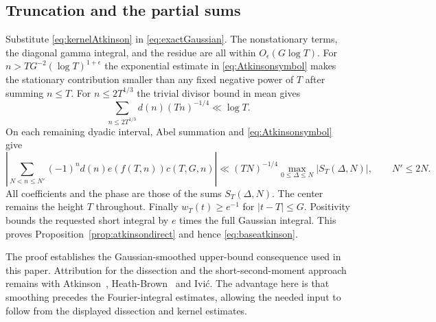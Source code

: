 \subsection{Truncation and the partial sums}
Substitute \eqref{eq:kernelAtkinson} in \eqref{eq:exactGaussian}.
The nonstationary terms, the diagonal gamma integral, and the residue
are all within $O_\epsilon(G\log T)$.
For $n>TG^{-2}(\log T)^{1+\epsilon}$ the exponential estimate in
\eqref{eq:Atkinsonsymbol} makes the stationary contribution smaller
than any fixed negative power of $T$ after summing $n\le T$.
For $n\le2T^{1/3}$ the trivial divisor bound in mean gives
\[
 \sum_{n\le2T^{1/3}}d(n)(Tn)^{-1/4}\ll\log T.
\]
On each remaining dyadic interval, Abel summation and
\eqref{eq:Atkinsonsymbol} give
\[
 \left|\sum_{N<n\le N'}(-1)^nd(n)e(f(T,n))c(T,G,n)\right|
 \ll (TN)^{-1/4}\max_{0\le\Delta\le N}|S_T(\Delta,N)|,
 \qquad N'\le2N.
\]
All coefficients and the phase are those of the sums $S_T(\Delta,N)$.
The center remains the height $T$ throughout. Finally $w_T(t)\ge e^{-1}$ for $|t-T|\le G$.
Positivity bounds the requested short integral by $e$ times the full
Gaussian integral. This proves Proposition~\ref{prop:atkinsondirect}
and hence \eqref{eq:baseatkinson}.

\begin{remark}
The proof establishes the Gaussian-smoothed upper-bound consequence
used in this paper. Attribution for the
dissection and the short-second-moment approach remains with
Atkinson~\cite{Atk49}, Heath-Brown~\cite{HB78} and Ivi\'c. The advantage here is that smoothing
precedes the Fourier-integral estimates, allowing the needed input
to follow from the displayed dissection and kernel estimates.
\end{remark}
